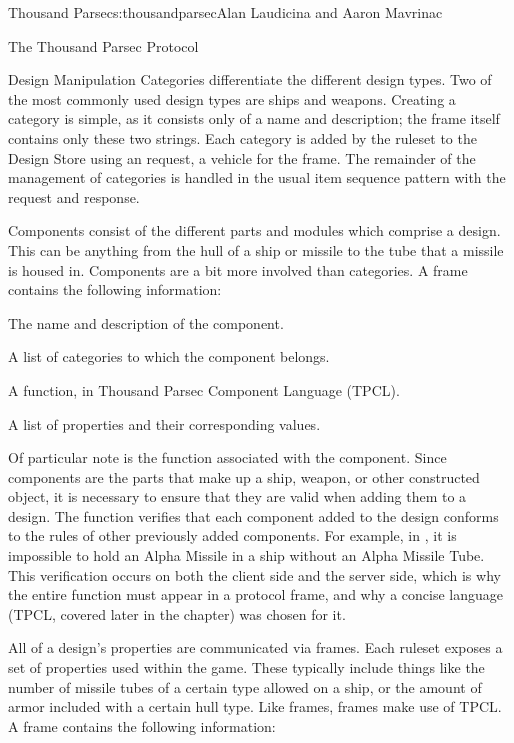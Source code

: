 \begin{aosachapter}{Thousand Parsec}{s:thousandparsec}{Alan Laudicina and Aaron Mavrinac}
\begin{aosasect1}{The Thousand Parsec Protocol}
\begin{aosasect2}{Design Manipulation}
Categories differentiate the different design types. Two of the most
commonly used design types are ships and weapons. Creating a category
is simple, as it consists only of a name and description; the
 frame itself contains only these two strings. Each
category is added by the ruleset to the Design Store using an
 request, a vehicle for the 
frame. The remainder of the management of categories is handled in the
usual item sequence pattern with the  request
and  response.

Components consist of the different parts and modules which comprise a
design. This can be anything from the hull of a ship or missile to the
tube that a missile is housed in. Components are a bit more involved
than categories. A  frame contains the following
information:

\begin{aosaitemize}

  \item The name and description of the component.

  \item A list of categories to which the component belongs.

  \item A  function, in Thousand Parsec Component
  Language (TPCL).

  \item A list of properties and their corresponding values.

\end{aosaitemize}

Of particular note is the  function associated with
the component. Since components are the parts that make up a ship,
weapon, or other constructed object, it is necessary to ensure that
they are valid when adding them to a design. The 
function verifies that each component added to the design conforms to
the rules of other previously added components. For example, in
, it is impossible to hold an Alpha
Missile in a ship without an Alpha Missile Tube. This verification
occurs on both the client side and the server side, which is why the
entire function must appear in a protocol frame, and why a concise
language (TPCL, covered later in the chapter) was chosen for it.

All of a design's properties are communicated via 
frames. Each ruleset exposes a set of properties used within the
game. These typically include things like the number of missile tubes
of a certain type allowed on a ship, or the amount of armor included
with a certain hull type. Like  frames,
 frames make use of TPCL\@. A  frame
contains the following information:


\end{aosasect2}
\end{aosasect1}
\end{aosachapter}

